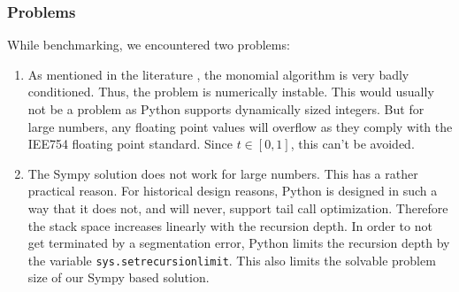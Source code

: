 \subsubsection{Problems}
While benchmarking, we encountered two problems:
\begin{enumerate}
    \item As mentioned in the literature \cite{10.5555/501891}, the monomial algorithm is very badly conditioned. Thus, the problem is numerically instable. This would usually not be a problem as Python supports dynamically sized integers. But for large numbers, any floating point values will overflow as they comply with the IEE754 floating point standard. Since $t \in [0,1]$, this can't be avoided.
    \item The Sympy solution does not work for large numbers. This has a rather practical reason. For historical design reasons, Python is designed in such a way that it does not, and will never, support tail call optimization. Therefore the stack space increases linearly with the recursion depth. In order to not get terminated by a segmentation error, Python limits the recursion depth by the variable \texttt{sys.setrecursionlimit}. This also limits the solvable problem size of our Sympy based solution.
\end{enumerate}